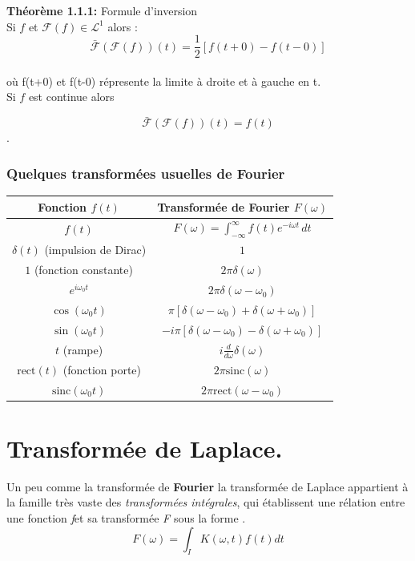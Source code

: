 \documentclass[12pt,a4paper]{report}
\begin{document}
\textbf{Théorème 1.1.1:} Formule d'inversion \\

Si $f$ et $\mathcal{F}(f) \in \mathcal{L}^{1}$ alors :\\

\[\mathcal{ \bar{ F}}(\mathcal{F}(f))(t)= \frac{1}{2} \left[f(t+0)-f(t-0) \right]\]\\

où  f(t+0) et f(t-0) répresente la limite à droite et à gauche en t.\\

Si $f$ est continue alors 

 \[\mathcal{ \bar{ F}}(\mathcal{F}(f))(t)= f(t)\].\\
 
 
 \subsubsection{  Quelques transformées usuelles de Fourier}
 
 \begin{center}
\begin{tabular}{|c|c|}
\hline
Fonction $f(t)$ & Transformée de Fourier $F(\omega)$ \\
\hline
$f(t)$ & $F(\omega) = \int_{-\infty}^{\infty} f(t) e^{-i\omega t} \, dt$ \\
\hline
$\delta(t)$ (impulsion de Dirac) & $1$ \\
\hline
$1$ (fonction constante) & $2\pi \delta(\omega)$ \\
\hline
$e^{i \omega_0 t}$ & $2\pi \delta(\omega - \omega_0)$ \\
\hline
$\cos(\omega_0 t)$ & $\pi [\delta(\omega - \omega_0) + \delta(\omega + \omega_0)]$ \\
\hline
$\sin(\omega_0 t)$ & $-i\pi [\delta(\omega - \omega_0) - \delta(\omega + \omega_0)]$ \\
\hline
$t$ (rampe) & $i \frac{d}{d\omega} \delta(\omega)$ \\
\hline
$\text{rect}(t)$ (fonction porte) & $2\pi \text{sinc}(\omega)$ \\
\hline
$\text{sinc}(\omega_0 t)$ & $2\pi \text{rect}(\omega - \omega_0)$ \\
\hline
\end{tabular}
\end{center}
\newpage

\section{ Transformée de Laplace. }
Un peu comme la transformée de \textbf{Fourier} la transformée de Laplace appartient à la famille très vaste des \textit{transformées intégrales}, qui établissent une rélation entre une fonction  \textit{f}et sa transformée \textit{F} sous la forme .\\
\begin{displaymath}
F(\omega)= \int_{I} K(\omega,t) f(t) \mathit{dt}
\end{displaymath}\\
\end{document}
